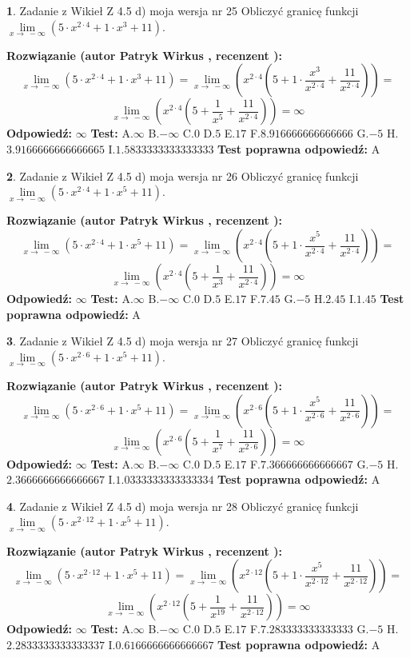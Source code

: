 \documentclass[12pt, a4paper]{article}
\theoremstyle{definition} %
\newtheorem{zad}{}
\newcommand{\zadStart}[1]{\begin{zad}#1\newline}
\newcommand{\zadStop}{\end{zad}}
\newcommand{\rozwStart}[2]{\noindent \textbf{Rozwiązanie (autor #1 , recenzent #2): }\newline}
\newcommand{\rozwStop}{\newline}
\newcommand{\odpStart}{\noindent \textbf{Odpowiedź:}\newline}
\newcommand{\odpStop}{\newline}
\newcommand{\testStart}{\noindent \textbf{Test:}\newline}
\newcommand{\testStop}{\newline}
\newcommand{\kluczStart}{\noindent \textbf{Test poprawna odpowiedź:}\newline}
\newcommand{\kluczStop}{\newline}
\begin{document}
\zadStart{Zadanie z Wikieł Z 4.5 d) moja wersja nr 25}
Obliczyć granicę funkcji  $\lim\limits_{x\to\ -\infty}(5 \cdot x^{2\cdot4}+1 \cdot x^{3}+11)$.
\zadStop
\rozwStart{Patryk Wirkus}{}
$$\lim\limits_{x\to\ -\infty}(5 \cdot x^{2\cdot4}+1 \cdot x^{3}+11) = \lim\limits_{x\to\ -\infty}(x^{2\cdot4}(5 +1 \cdot \frac{x^{3}}{x^{2\cdot4}}+\frac{11}{x^{2\cdot4}})) =$$ $$\lim\limits_{x\to\ -\infty}(x^{2\cdot4}(5 +\frac{1}{x^{5}}+\frac{11}{x^{2\cdot4}})) =\infty$$
\rozwStop
\odpStart
$\infty$
\odpStop
\testStart
A.$\infty$ B.$-\infty$ C.$0$ D.$5$ E.$17$
F.$8.916666666666666$ G.$-5$
H.$3.9166666666666665$
I.$1.5833333333333333$
\testStop
\kluczStart
A
\kluczStop



\zadStart{Zadanie z Wikieł Z 4.5 d) moja wersja nr 26}
Obliczyć granicę funkcji  $\lim\limits_{x\to\ -\infty}(5 \cdot x^{2\cdot4}+1 \cdot x^{5}+11)$.
\zadStop
\rozwStart{Patryk Wirkus}{}
$$\lim\limits_{x\to\ -\infty}(5 \cdot x^{2\cdot4}+1 \cdot x^{5}+11) = \lim\limits_{x\to\ -\infty}(x^{2\cdot4}(5 +1 \cdot \frac{x^{5}}{x^{2\cdot4}}+\frac{11}{x^{2\cdot4}})) =$$ $$\lim\limits_{x\to\ -\infty}(x^{2\cdot4}(5 +\frac{1}{x^{3}}+\frac{11}{x^{2\cdot4}})) =\infty$$
\rozwStop
\odpStart
$\infty$
\odpStop
\testStart
A.$\infty$ B.$-\infty$ C.$0$ D.$5$ E.$17$
F.$7.45$ G.$-5$
H.$2.45$
I.$1.45$
\testStop
\kluczStart
A
\kluczStop



\zadStart{Zadanie z Wikieł Z 4.5 d) moja wersja nr 27}
Obliczyć granicę funkcji  $\lim\limits_{x\to\ -\infty}(5 \cdot x^{2\cdot6}+1 \cdot x^{5}+11)$.
\zadStop
\rozwStart{Patryk Wirkus}{}
$$\lim\limits_{x\to\ -\infty}(5 \cdot x^{2\cdot6}+1 \cdot x^{5}+11) = \lim\limits_{x\to\ -\infty}(x^{2\cdot6}(5 +1 \cdot \frac{x^{5}}{x^{2\cdot6}}+\frac{11}{x^{2\cdot6}})) =$$ $$\lim\limits_{x\to\ -\infty}(x^{2\cdot6}(5 +\frac{1}{x^{7}}+\frac{11}{x^{2\cdot6}})) =\infty$$
\rozwStop
\odpStart
$\infty$
\odpStop
\testStart
A.$\infty$ B.$-\infty$ C.$0$ D.$5$ E.$17$
F.$7.366666666666667$ G.$-5$
H.$2.3666666666666667$
I.$1.0333333333333334$
\testStop
\kluczStart
A
\kluczStop



\zadStart{Zadanie z Wikieł Z 4.5 d) moja wersja nr 28}
Obliczyć granicę funkcji  $\lim\limits_{x\to\ -\infty}(5 \cdot x^{2\cdot12}+1 \cdot x^{5}+11)$.
\zadStop
\rozwStart{Patryk Wirkus}{}
$$\lim\limits_{x\to\ -\infty}(5 \cdot x^{2\cdot12}+1 \cdot x^{5}+11) = \lim\limits_{x\to\ -\infty}(x^{2\cdot12}(5 +1 \cdot \frac{x^{5}}{x^{2\cdot12}}+\frac{11}{x^{2\cdot12}})) =$$ $$\lim\limits_{x\to\ -\infty}(x^{2\cdot12}(5 +\frac{1}{x^{19}}+\frac{11}{x^{2\cdot12}})) =\infty$$
\rozwStop
\odpStart
$\infty$
\odpStop
\testStart
A.$\infty$ B.$-\infty$ C.$0$ D.$5$ E.$17$
F.$7.283333333333333$ G.$-5$
H.$2.2833333333333337$
I.$0.6166666666666667$
\testStop
\kluczStart
A
\kluczStop
\end{document}

